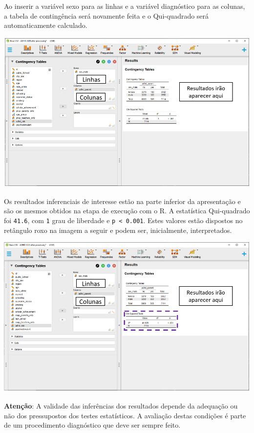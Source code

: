 \documentclass[
]{book}
\begin{document}
Ao inserir a variável sexo para as linhas e a variável diagnóstico para as colunas, a tabela de contingência será novamente feita e o Qui-quadrado será automaticamente calculado.

\includegraphics{./img/cap_x2_resultados.png}

Os resultados inferenciais de interesse estão na parte inferior da apresentação e são os mesmos obtidos na etapa de execução com o R. A estatística Qui-quadrado foi \texttt{41.6}, com \texttt{1} grau de liberdade e \texttt{p\ \textless{}\ 0.001}. Estes valores estão dispostos no retângulo roxo na imagem a seguir e podem ser, inicialmente, interpretados.

\includegraphics{./img/cap_x2_resultados2.png}

\textbf{Atenção}: A validade das inferências dos resultados depende da adequação ou não dos pressupostos dos testes estatísticos. A avaliação destas condições é parte de um procedimento diagnóstico que deve ser sempre feito.
\end{document}
